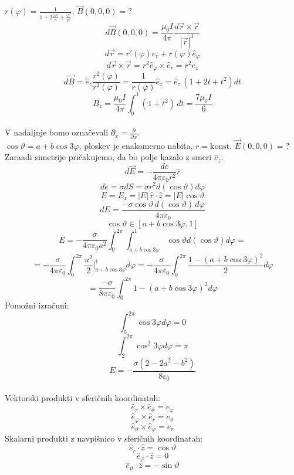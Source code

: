 \documentclass[a4paper]{article}
\newcommand{\vct}[1]{\overrightarrow{#1}}
\newcommand{\pd}[2]{\frac{\partial {#1}}{\partial {#2}}}
\begin{document}
$\displaystyle{r(\varphi) = \frac{1}{1 + 2\frac{|\varphi|}{\pi} + \frac{\varphi^2}{\pi^2}}}$, $\vct{B}(0, 0, 0) = ?$
$$d\vct{B}(0, 0, 0) = \frac{\mu_0I}{4\pi}\frac{d\vct{r}\times\vct{r}}{|\vct{r}|^3}$$
$$d\vct{r} = r'(\varphi)\hat{e}_r + r(\varphi)\hat{e}_\varphi$$
$$d\vct{r}\times\vct{r} = r^2\hat{e}_\varphi\times\hat{e}_r = r^2e_z$$
$$d\vct{B} = \hat{e}_z\frac{r^2(\varphi)}{r^3(\varphi)} = \frac{1}{r(\varphi)}\hat{e}_z = \hat{e}_z\,\left(1 + 2t + t^2\right)dt$$
$$B_z = \frac{\mu_0I}{4\pi}\int_{0}^{1} (1+t^2)\,dt = \frac{7\mu_0I}{6}$$
\\
V nadaljnje bomo označevali $\displaystyle{\partial_x = \pd{}{x}}$. \\[3mm]
$\displaystyle{\cos\vartheta = a + b\cos 3\varphi}$, ploskev je enakomerno nabita, $r=\text{konst.}$
$\vct{E}(0, 0, 0) = ?$ \\[3mm]
Zaraadi simetrije pričakujemo, da bo polje kazalo z smeri $\hat{e}_z$.
$$d\vct{E} = -\frac{de}{4\pi\varepsilon_0r^2} \hat{r}$$
$$de = \sigma dS = \sigma r^2d(\cos\vartheta)d\varphi$$
$$E = E_z = |E|\,\hat{r}\cdot\hat{z} = |E|\cos\vartheta$$
$$dE = \frac{-\sigma\cos\vartheta\,d(\cos\vartheta)\,d\varphi}{4\pi\varepsilon_0}$$
$$\cos\vartheta \in [a + b\cos 3\varphi, 1]$$
$$E = -\frac{\sigma}{4\pi\varepsilon_0 a^2} \int_{0}^{2\pi}\int_{a + b\cos 3\varphi}^{1}\cos\vartheta d(\cos\vartheta)d\varphi = $$
$$ = -\frac{\sigma}{4\pi\varepsilon_0}\int_{0}^{2\pi}\frac{u^2}{2}\Big|_{a+b\cos 3\varphi}^{1}d\varphi =
-\frac{\sigma}{4\pi\varepsilon_0}\int_{0}^{2\pi} \frac{1-(a + b\cos 3\varphi)^2}{2}d\varphi$$
$$ = \frac{-\sigma}{8\pi\varepsilon_0} \int_{0}^{2\pi} 1 - (a + b\cos 3\varphi)^2d\varphi$$
Pomožni izračuni:
$$\int_{0}^{2\pi} \cos 3\varphi d\varphi = 0$$
$$\int_{2}^{2\pi} \cos^2 3\varphi d\varphi = \pi$$
$$E = -\frac{\sigma (2-2a^2-b^2)}{8\varepsilon_0}$$
\\
Vektorski produkti v sferičnih koordinatah: \\
$$\hat{e}_r\times\hat{e}_\vartheta=e_\varphi$$
$$\hat{e}_\varphi\times\hat{e}_r=e_\vartheta$$
$$\hat{e}_\vartheta\times\hat{e}_\varphi=e_r$$
Skalarni produkti z navpišnico v sferičnih koordinatah:
$$\hat{e}_r \cdot \hat{z} = \cos\vartheta$$
$$\hat{e}_\varphi \cdot \hat{z} = 0$$
$$\hat{e}_\vartheta \cdot \hat{z} = -\sin\vartheta$$
\end{document}

